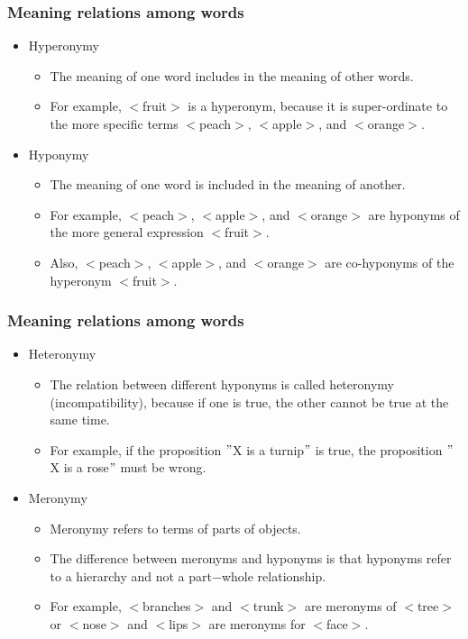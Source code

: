 \documentclass[12pt, table]{beamer}
\begin{document}
\begin{frame}
\frametitle{Meaning relations among words}
\begin{itemize}
\item Hyperonymy
\begin{itemize}
\item The meaning of one word includes in the meaning of other words. 
\item For example, $<$fruit$>$ is a hyperonym, because it is super-ordinate to the more specific terms $<$peach$>$, $<$apple$>$, and $<$orange$>$.
\end{itemize}
\item Hyponymy
\begin{itemize}
\item The meaning of one word is included in the meaning of another. 
\item For example, $<$peach$>$, $<$apple$>$, and $<$orange$>$ are hyponyms of the more general expression $<$fruit$>$.
\item Also, $<$peach$>$, $<$apple$>$, and $<$orange$>$ are co-hyponyms of the hyperonym $<$fruit$>$.
\end{itemize}
\end{itemize}
\end{frame}

\begin{frame}
\frametitle{Meaning relations among words}
\begin{itemize}
\item Heteronymy
\begin{itemize}
\item The relation between different hyponyms is called heteronymy (incompatibility), because if one is true, the other cannot be true at the same time.
\item For example, if the proposition $"$X is a turnip$"$ is true, the proposition $"$X is a rose$"$ must be wrong.
\end{itemize}
\item Meronymy
\begin{itemize}
\item Meronymy refers to terms of parts of objects.
\item The difference between meronyms and hyponyms is that hyponyms refer to a hierarchy and not a part$-$whole relationship. 
\item For example, $<$branches$>$ and $<$trunk$>$ are meronyms of $<$tree$>$ or $<$nose$>$ and $<$lips$>$ are meronyms for $<$face$>$.  
\end{itemize}
\end{itemize}
\end{frame}
\end{document}
